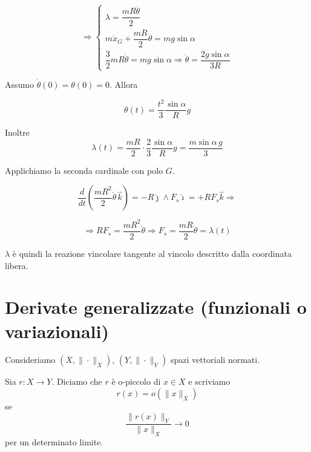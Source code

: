 \begin{example}{}
\[
\Rightarrow
\begin{cases}
\lambda=\dfrac{mR\ddot{\theta}}{2}
\\[0.8em]
m\ddot{x}_G+\dfrac{mR}{2}\ddot{\theta}=mg\sin\alpha
\\[0.8em]
\dfrac{3}{2}mR\ddot{\theta}=mg\sin\alpha
\Rightarrow
\ddot{\theta}=\dfrac{2g\sin\alpha}{3R}
\end{cases}
\]

Assumo \(\dot{\theta}(0)=\theta(0)=0\). Allora

\[
\theta(t)=\frac{t^2}{3}\frac{\sin\alpha}{R}g
\]

Inoltre
\[
\lambda(t)=\frac{mR}{2}\cdot\frac{2}{3}\frac{\sin\alpha}{R}g
=
\frac{m\sin\alpha\, g}{3}
\]

Applichiamo la seconda cardinale con polo \(G\).

\[
\frac{d}{dt}\left(\frac{mR^2}{2}\dot{\theta}\,\hat{k}\right)
=
-R\hat{\jmath}\wedge F_s\hat{\imath}
=
+RF_s\hat{k}
\Rightarrow
\]

\[
\Rightarrow
RF_s=\frac{mR^2}{2}\ddot{\theta}
\Rightarrow
F_s=\frac{mR}{2}\ddot{\theta}
=
\lambda(t)
\]

\(\lambda\) è quindi la reazione vincolare tangente al vincolo descritto dalla coordinata libera.
\end{example}

\section{Derivate generalizzate (funzionali o variazionali)}
Consideriamo \((X,\|\cdot\|_X)\), \((Y,\|\cdot\|_Y)\) spazi vettoriali normati.
\begin{definition}{}


Sia \(r:X\to Y\). Diciamo che \(r\) è o-piccolo di \(x\in X\) e scriviamo
\[
r(x)=o(\|x\|_X)
\]
se
\[
\frac{\|r(x)\|_Y}{\|x\|_X}\longrightarrow 0
\]
per un determinato limite.
\end{definition}


